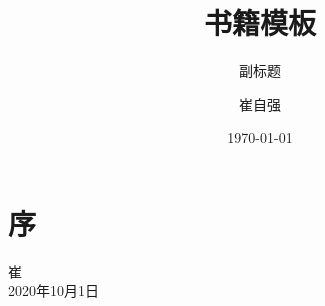 \documentclass[cn,11pt,chinese]{elegantbook}
\title{书籍模板}
\subtitle{副标题}
\author{崔自强}
\institute{天津大学自动化学院}
\date{\today}
\begin{document}
\maketitle
\frontmatter

\chapter*{序}




\vskip 1.5cm

\begin{flushright}
崔\\
2020年10月1日
\end{flushright}

\tableofcontents

\mainmatter

% 


\cite{Dashliborun2019a}




\end{document}
